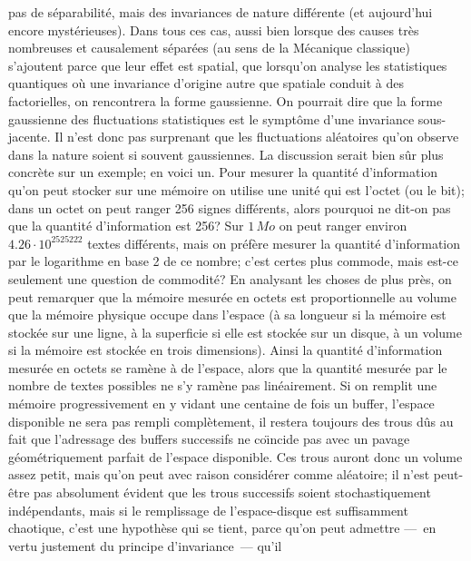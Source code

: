 pas de s\'eparabilit\'e,  mais des invariances de nature diff\'erente (et 
aujourd'hui encore myst\'erieuses).  Dans tous ces cas,  aussi bien lorsque 
des causes tr\`es nombreuses et causalement s\'epar\'ees (au sens de la 
M\'ecanique classique) s'ajoutent parce que leur effet est spatial,  que 
lorsqu'on analyse les statistiques quantiques o\`u une invariance  
d'origine autre que spatiale conduit \`a des factorielles,  on rencontrera 
la forme gaussienne.  On pourrait dire que la forme gaussienne des 
fluctuations statistiques est le sympt\^ome d'une invariance 
sous-jacente. 
\medskip 
Il n'est donc pas surprenant que les fluctuations al\'eatoires qu'on  
observe dans la nature soient si souvent gaussiennes.    
\medskip 
La discussion serait bien s\^ur plus concr\`ete sur un exemple;  en voici  
un.  Pour mesurer la quantit\'e d'information qu'on peut stocker sur une 
m\'emoire on utilise une unit\'e qui est l'octet (ou le bit);  dans un octet 
on peut ranger 256 signes diff\'erents,  alors pourquoi ne dit-on pas que  
la quantit\'e d'information est 256?  Sur $1\, Mo$ on peut ranger environ 
$4.26 \cdot 10^{2525222}$ textes diff\'erents,  mais on pr\'ef\`ere 
mesurer la quantit\'e d'information par le logarithme en base 2 de ce 
nombre;  c'est certes plus commode,  mais est-ce seulement une question 
de commodit\'e?    
\medskip 
En analysant les choses de plus pr\`es,  on peut remarquer que la  
m\'emoire mesur\'ee en octets est proportionnelle au volume que la 
m\'emoire physique occupe dans l'espace (\`a sa longueur si la m\'emoire 
est stock\'ee sur une ligne,  \`a la superficie si elle est stock\'ee sur un 
disque, \`a un volume si la m\'emoire est stock\'ee en trois dimensions). 
Ainsi la quantit\'e d'information mesur\'ee en octets se ram\`ene \`a de 
l'espace,  alors que la quantit\'e mesur\'ee par le nombre de textes 
possibles ne s'y ram\`ene pas lin\'eairement.  Si on remplit une m\'emoire 
progressivement en y vidant une centaine de fois un buffer,  l'espace 
disponible ne sera pas rempli compl\`etement,  il restera toujours des  
trous d\^us au fait que l'adressage des buffers successifs ne co{\"\i}ncide 
pas avec un pavage g\'eom\'etriquement parfait de l'espace disponible. 
Ces trous auront donc un volume assez petit,  mais qu'on peut  
avec raison consid\'erer comme al\'eatoire;  il n'est peut-\^etre pas 
absolument \'evident que les trous successifs soient stochastiquement 
ind\'ependants,  mais si le remplissage de l'espace-disque est 
suffisamment chaotique,  c'est une hypoth\`ese qui se tient,  parce qu'on 
peut admettre ---~en vertu justement du principe d'invariance~--- qu'il 

